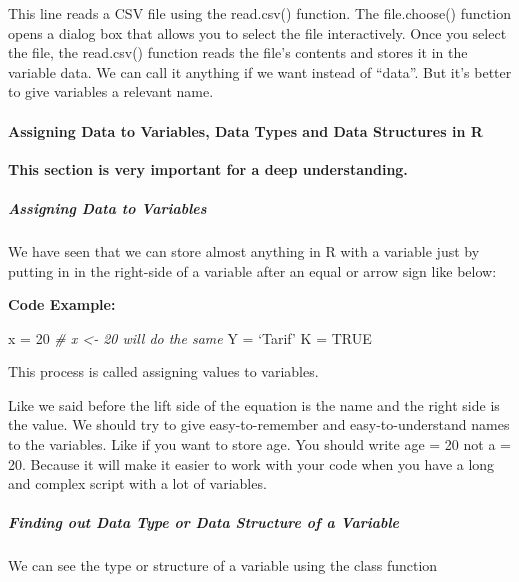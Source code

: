 \documentclass[
]{article}
\newenvironment{Shaded}{\begin{snugshade}}{\end{snugshade}}
\newcommand{\CommentTok}[1]{\textcolor[rgb]{0.56,0.35,0.01}{\textit{#1}}}
\newcommand{\ConstantTok}[1]{\textcolor[rgb]{0.56,0.35,0.01}{#1}}
\newcommand{\DecValTok}[1]{\textcolor[rgb]{0.00,0.00,0.81}{#1}}
\newcommand{\NormalTok}[1]{#1}
\newcommand{\OtherTok}[1]{\textcolor[rgb]{0.56,0.35,0.01}{#1}}
\begin{document}
This line reads a CSV file using the read.csv() function. The
file.choose() function opens a dialog box that allows you to select the
file interactively. Once you select the file, the read.csv() function
reads the file's contents and stores it in the variable data. We can
call it anything if we want instead of ``data''. But it's better to give
variables a relevant name.

\hypertarget{assigning-data-to-variables-data-types-and-data-structures-in-r}{%
\paragraph{Assigning Data to Variables, Data Types and Data Structures
in
R}\label{assigning-data-to-variables-data-types-and-data-structures-in-r}}

\textbf{This section is very important for a deep understanding.}

\hypertarget{assigning-data-to-variables}{%
\subparagraph{Assigning Data to
Variables}\label{assigning-data-to-variables}}

We have seen that we can store almost anything in R with a variable just
by putting in in the right-side of a variable after an equal or arrow
sign like below:

\textbf{Code Example:}

\begin{Shaded}
\begin{Highlighting}[]
\NormalTok{x }\OtherTok{=} \DecValTok{20}  \CommentTok{\# x \textless{}{-} 20 will do the same }
\NormalTok{Y }\OtherTok{=}\NormalTok{ ‘Tarif’ }
\NormalTok{K }\OtherTok{=} \ConstantTok{TRUE}
\end{Highlighting}
\end{Shaded}

This process is called assigning values to variables.

Like we said before the lift side of the equation is the name and the
right side is the value. We should try to give easy-to-remember and
easy-to-understand names to the variables. Like if you want to store
age. You should write age = 20 not a = 20. Because it will make it
easier to work with your code when you have a long and complex script
with a lot of variables.

\hypertarget{finding-out-data-type-or-data-structure-of-a-variable}{%
\subparagraph{Finding out Data Type or Data Structure of a
Variable}\label{finding-out-data-type-or-data-structure-of-a-variable}}

We can see the type or structure of a variable using the class function
\end{document}
